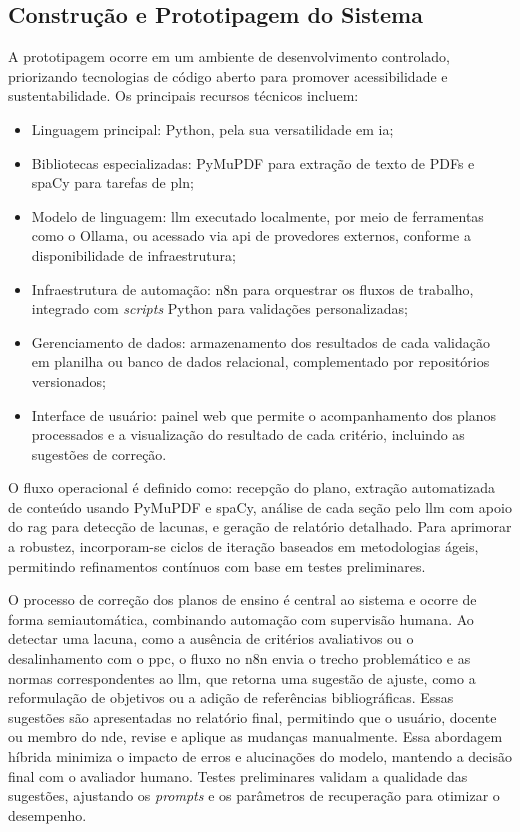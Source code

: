\subsection{Construção e Prototipagem do Sistema}
A prototipagem ocorre em um ambiente de desenvolvimento controlado, priorizando tecnologias de código aberto para promover acessibilidade e sustentabilidade. Os principais recursos técnicos incluem:
\begin{itemize}
    \item Linguagem principal: Python, pela sua versatilidade em \gls{ia};
    \item Bibliotecas especializadas: PyMuPDF para extração de texto de PDFs e spaCy para tarefas de \gls{pln};
    \item Modelo de linguagem: \gls{llm} executado localmente, por meio de ferramentas como o Ollama, ou acessado via \gls{api} de provedores externos, conforme a disponibilidade de infraestrutura;
    \item Infraestrutura de automação: n8n para orquestrar os fluxos de trabalho, integrado com \textit{scripts} Python para validações personalizadas;
    \item Gerenciamento de dados: armazenamento dos resultados de cada validação em planilha ou banco de dados relacional, complementado por repositórios versionados;
    \item Interface de usuário: painel web que permite o acompanhamento dos planos processados e a visualização do resultado de cada critério, incluindo as sugestões de correção.
\end{itemize}
O fluxo operacional é definido como: recepção do plano, extração automatizada de conteúdo usando PyMuPDF e spaCy, análise de cada seção pelo \gls{llm} com apoio do \gls{rag} para detecção de lacunas, e geração de relatório detalhado. Para aprimorar a robustez, incorporam-se ciclos de iteração baseados em metodologias ágeis, permitindo refinamentos contínuos com base em testes preliminares.

O processo de correção dos planos de ensino é central ao sistema e ocorre de forma semiautomática, combinando automação com supervisão humana. Ao detectar uma lacuna, como a ausência de critérios avaliativos ou o desalinhamento com o \gls{ppc}, o fluxo no n8n envia o trecho problemático e as normas correspondentes ao \gls{llm}, que retorna uma sugestão de ajuste, como a reformulação de objetivos ou a adição de referências bibliográficas. Essas sugestões são apresentadas no relatório final, permitindo que o usuário, docente ou membro do \gls{nde}, revise e aplique as mudanças manualmente. Essa abordagem híbrida minimiza o impacto de erros e alucinações do modelo, mantendo a decisão final com o avaliador humano. Testes preliminares validam a qualidade das sugestões, ajustando os \textit{prompts} e os parâmetros de recuperação para otimizar o desempenho.

